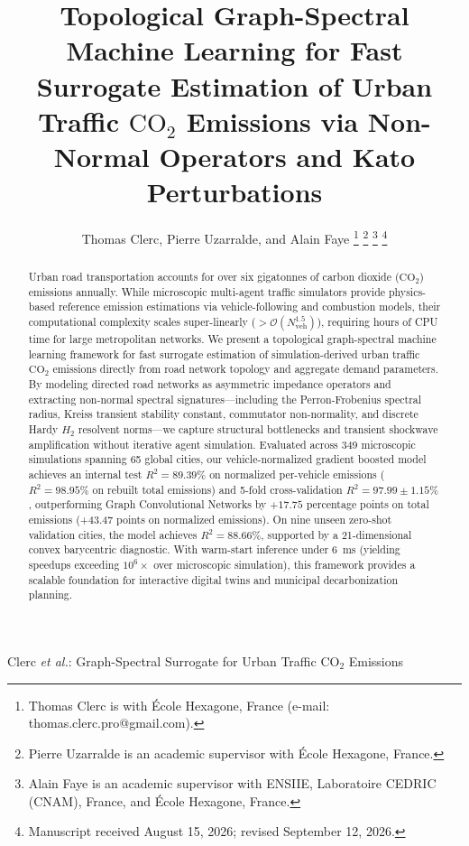 \documentclass[journal]{IEEEtran}
\begin{document}
\title{Topological Graph-Spectral Machine Learning for Fast Surrogate Estimation of Urban Traffic $\text{CO}_2$ Emissions via Non-Normal Operators and Kato Perturbations}

\author{Thomas Clerc, Pierre Uzarralde, and Alain Faye%
\thanks{Thomas Clerc is with \'Ecole Hexagone, France (e-mail: thomas.clerc.pro@gmail.com).}%
\thanks{Pierre Uzarralde is an academic supervisor with \'Ecole Hexagone, France.}%
\thanks{Alain Faye is an academic supervisor with ENSIIE, Laboratoire CEDRIC (CNAM), France, and \'Ecole Hexagone, France.}%
\thanks{Manuscript received August 15, 2026; revised September 12, 2026.}}

%
{Clerc \MakeLowercase{\textit{et al.}}: Graph-Spectral Surrogate for Urban Traffic $\text{CO}_2$ Emissions}

\maketitle

\begin{abstract}
Urban road transportation accounts for over six gigatonnes of carbon dioxide ($\text{CO}_2$) emissions annually. While microscopic multi-agent traffic simulators provide physics-based reference emission estimations via vehicle-following and combustion models, their computational complexity scales super-linearly ($>\mathcal{O}(N_{\text{veh}}^{1.5})$), requiring hours of CPU time for large metropolitan networks. We present a topological graph-spectral machine learning framework for fast surrogate estimation of simulation-derived urban traffic $\text{CO}_2$ emissions directly from road network topology and aggregate demand parameters. By modeling directed road networks as asymmetric impedance operators and extracting non-normal spectral signatures---including the Perron-Frobenius spectral radius, Kreiss transient stability constant, commutator non-normality, and discrete Hardy $H_2$ resolvent norms---we capture structural bottlenecks and transient shockwave amplification without iterative agent simulation. Evaluated across 349 microscopic simulations spanning 65 global cities, our vehicle-normalized gradient boosted model achieves an internal test $R^2 = 89.39\%$ on normalized per-vehicle emissions ($R^2 = 98.95\%$ on rebuilt total emissions) and 5-fold cross-validation $R^2 = 97.99 \pm 1.15\%$, outperforming Graph Convolutional Networks by $+17.75$ percentage points on total emissions (+43.47 points on normalized emissions). On nine unseen zero-shot validation cities, the model achieves $R^2 = 88.66\%$, supported by a 21-dimensional convex barycentric diagnostic. With warm-start inference under 6~ms (yielding speedups exceeding $10^6\times$ over microscopic simulation), this framework provides a scalable foundation for interactive digital twins and municipal decarbonization planning.
\end{abstract}
\end{document}
